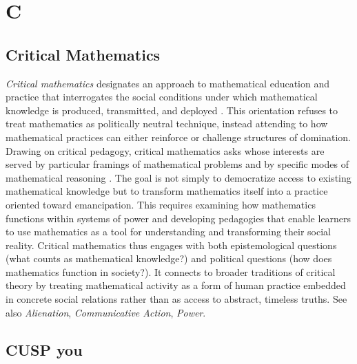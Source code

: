 \documentclass{book}
\begin{document}
\chapter{C}

\section{Critical Mathematics}

\textit{Critical mathematics} designates an approach to mathematical education and practice that interrogates the social conditions under which mathematical knowledge is produced, transmitted, and deployed \parencite{Gutstein:2006aa, skovsmose_critical_2023,Skovsmose:2014aa}. This orientation refuses to treat mathematics as politically neutral technique, instead attending to how mathematical practices can either reinforce or challenge structures of domination. Drawing on critical pedagogy, critical mathematics asks whose interests are served by particular framings of mathematical problems and by specific modes of mathematical reasoning \parencite{Gutstein:2006aa}. The goal is not simply to democratize access to existing mathematical knowledge but to transform mathematics itself into a practice oriented toward emancipation. This requires examining how mathematics functions within systems of power and developing pedagogies that enable learners to use mathematics as a tool for understanding and transforming their social reality. Critical mathematics thus engages with both epistemological questions (what counts as mathematical knowledge?) and political questions (how does mathematics function in society?). It connects to broader traditions of critical theory by treating mathematical activity as a form of human practice embedded in concrete social relations rather than as access to abstract, timeless truths. See also \textit{Alienation}, \textit{Communicative Action}, \textit{Power}.

\section{CUSP you}
\end{document}
